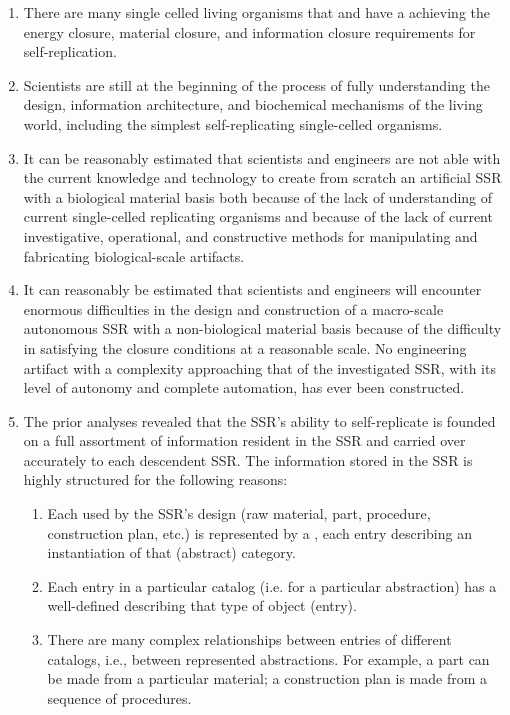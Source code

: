 \begin{enumerate}
\item There are many single celled living organisms that
 and have a  achieving the energy closure, material
closure, and information closure requirements for self-replication.
\item Scientists are still at the beginning of the process of
fully understanding the design, information architecture,
and biochemical mechanisms of the living world, including
the simplest self-replicating single-celled organisms.  
\item It can be reasonably estimated that scientists and
engineers are not able with the current knowledge and technology to
create from scratch an artificial SSR with a biological
material basis both because of the lack of understanding of current single-celled
replicating organisms and because of the lack of current investigative,
operational, and constructive methods for manipulating and fabricating 
biological-scale artifacts.
\item It can reasonably be estimated that scientists and
engineers will encounter enormous difficulties in the
design and construction of a macro-scale autonomous SSR with a
non-biological material basis because of the difficulty
in satisfying the closure conditions at a reasonable scale.  No engineering
artifact with a complexity approaching that of the investigated SSR, with
its level of autonomy and complete automation, has ever been constructed.
\item The prior analyses revealed that the SSR's
ability to self-replicate is founded on a full assortment of
 information resident in the SSR and carried over
accurately to each descendent SSR.  The information stored in the SSR
is highly structured for the following reasons:

\begin{enumerate}
\item Each  used by the SSR's design (raw
material, part, procedure, construction plan, etc.) is represented by a
, each entry describing an instantiation of
that (abstract) category.
\item Each entry in a particular catalog (i.e. for a particular
abstraction) has a well-defined  describing
that type of object (entry).
\item There are many complex relationships between entries of
different catalogs, i.e., between represented abstractions. For example,
a part can be made from a particular material; a construction plan is
made from a sequence of procedures.
\end{enumerate}
\end{enumerate}


